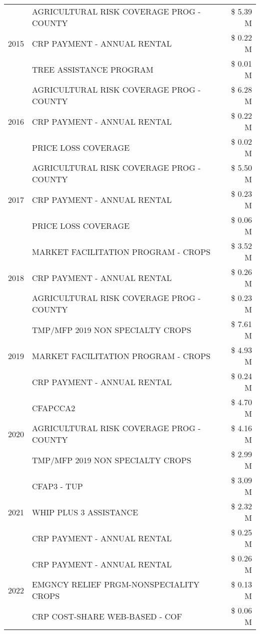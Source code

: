 \begin{tabular}{llr}
\multirow[t]{3}{*}{2015} & AGRICULTURAL RISK COVERAGE PROG - COUNTY & \$ 5.39 M \\
 & CRP PAYMENT - ANNUAL RENTAL & \$ 0.22 M \\
 & TREE ASSISTANCE PROGRAM & \$ 0.01 M \\
\cline{1-3}
\multirow[t]{3}{*}{2016} & AGRICULTURAL RISK COVERAGE PROG - COUNTY & \$ 6.28 M \\
 & CRP PAYMENT - ANNUAL RENTAL & \$ 0.22 M \\
 & PRICE LOSS COVERAGE & \$ 0.02 M \\
\cline{1-3}
\multirow[t]{3}{*}{2017} & AGRICULTURAL RISK COVERAGE PROG - COUNTY & \$ 5.50 M \\
 & CRP PAYMENT - ANNUAL RENTAL & \$ 0.23 M \\
 & PRICE LOSS COVERAGE & \$ 0.06 M \\
\cline{1-3}
\multirow[t]{3}{*}{2018} & MARKET FACILITATION PROGRAM - CROPS & \$ 3.52 M \\
 & CRP PAYMENT - ANNUAL RENTAL & \$ 0.26 M \\
 & AGRICULTURAL RISK COVERAGE PROG - COUNTY & \$ 0.23 M \\
\cline{1-3}
\multirow[t]{3}{*}{2019} & TMP/MFP 2019 NON SPECIALTY CROPS & \$ 7.61 M \\
 & MARKET FACILITATION PROGRAM - CROPS & \$ 4.93 M \\
 & CRP PAYMENT - ANNUAL RENTAL & \$ 0.24 M \\
\cline{1-3}
\multirow[t]{3}{*}{2020} & CFAPCCA2 & \$ 4.70 M \\
 & AGRICULTURAL RISK COVERAGE PROG - COUNTY & \$ 4.16 M \\
 & TMP/MFP 2019 NON SPECIALTY CROPS & \$ 2.99 M \\
\cline{1-3}
\multirow[t]{3}{*}{2021} & CFAP3 - TUP & \$ 3.09 M \\
 & WHIP PLUS 3 ASSISTANCE & \$ 2.32 M \\
 & CRP PAYMENT - ANNUAL RENTAL & \$ 0.25 M \\
\cline{1-3}
\multirow[t]{3}{*}{2022} & CRP PAYMENT - ANNUAL RENTAL & \$ 0.26 M \\
 & EMGNCY RELIEF PRGM-NONSPECIALITY CROPS & \$ 0.13 M \\
 & CRP COST-SHARE WEB-BASED - COF & \$ 0.06 M \\
\cline{1-3}
\bottomrule
\end{tabular}
